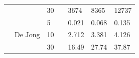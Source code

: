 \documentclass[paper=a4, fontsize=11pt]{scrartcl}
\begin{document}
\begin{table}[h]
\begin{tabular}{|l|l|l|l|l|l|l|}
                                                                                  &                                                               & 30            &                      & 3674       & 8365       & 12737      \\ \cline{2-3} \cline{5-7}
                                                                                  & \multirow{3}{*}{De Jong}                                      & 5             &                      & 0.021      & 0.068      & 0.135      \\ 
                                                                                  &                                                               & 10            &                      & 2.712      & 3.381      & 4.126      \\
                                                                                  &                                                               & 30            &                      & 16.49      & 27.74      & 37.87      \\ \hline
    \end{tabular}
\end{table}
\end{document}
